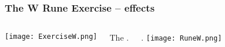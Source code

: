 
\begin{frame}
\frametitle{The W Rune Exercise -- effects}
\begin{columns}[c] %

\texttt{[image: ExerciseW.png]}

The .

\vspace{5mm}
.
\texttt{[image: RuneW.png]}
\end{columns}

\end{frame}








